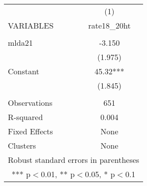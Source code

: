 \begin{tabular}{lc} \hline
 & (1) \\
VARIABLES & rate18\_20ht \\ \hline
 &  \\
mlda21 & -3.150 \\
 & (1.975) \\
Constant & 45.32*** \\
 & (1.845) \\
 &  \\
Observations & 651 \\
R-squared & 0.004 \\
Fixed Effects & None \\
 Clusters & None \\ \hline
\multicolumn{2}{c}{ Robust standard errors in parentheses} \\
\multicolumn{2}{c}{ *** p$<$0.01, ** p$<$0.05, * p$<$0.1} \\
\end{tabular}
